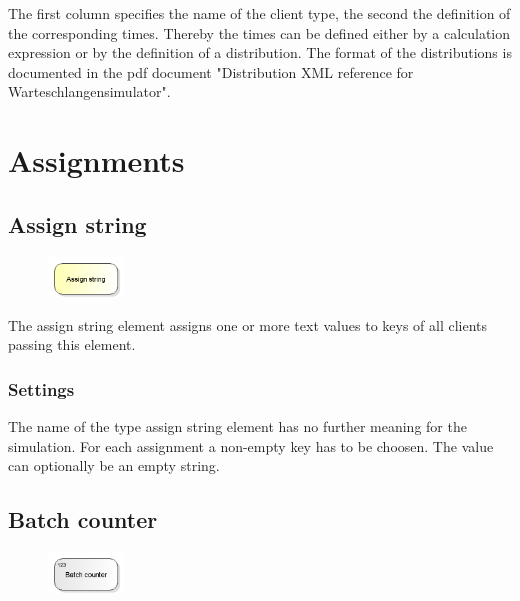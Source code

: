 The first column specifies the name of the client type, the second the definition of the corresponding times.
Thereby the times can be defined either by a calculation expression or by the definition of a
distribution. The format of the distributions is documented in the pdf document
"Distribution XML reference for Warteschlangensimulator".





\chapter{Assignments}

\section{Assign string}
\label{ref:ModelElementAssignString}

\begin{figure}
\vspace{-22pt}
\includegraphics[width=2cm]{imageModelElementAssignString.png}
\vspace{-22pt}
\end{figure}

The assign string element assigns one or more text values to keys of all clients passing this element.

\subsection*{Settings}

The name of the type assign string element has no further meaning for the simulation.
For each assignment a non-empty key has to be choosen. The value can optionally be an empty string.


\section{Batch counter}
\label{ref:ModelElementCounterBatch}

\begin{figure}
\vspace{-22pt}
\includegraphics[width=2cm]{imageModelElementCounterBatch.png}
\vspace{-22pt}
\end{figure}

